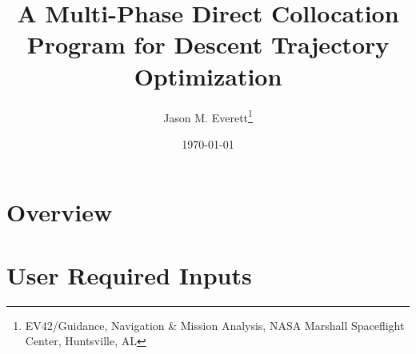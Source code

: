 \documentclass[10pt]{article}
\begin{document}
\title{\textbf{A Multi-Phase Direct Collocation Program for Descent Trajectory Optimization}}
\author{Jason M. Everett\thanks{EV42/Guidance, Navigation \& Mission Analysis, NASA Marshall Spaceflight Center, Huntsville, AL}}
\date{\printdayoff\today}

\maketitle

\newpage
\section{Overview}


\section{User Required Inputs}

\end{document}
